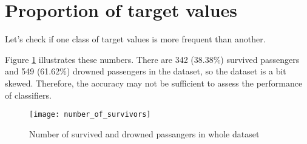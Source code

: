 \section{Proportion of target values}

Let's check if one class of target values is more frequent than another.

Figure \ref{number_of_survivors} illustrates these numbers. There are 342 
(38.38\%) survived passengers and 549 (61.62\%) drowned passengers in the 
dataset, so the dataset is a bit skewed. Therefore, the accuracy may not be 
sufficient to assess the performance of classifiers.

\begin{figure}[!ht]
	\centering
	\texttt{[image: number\_of\_survivors]}
	\caption{Number of survived and drowned passangers in whole dataset}
	\label{number_of_survivors}
\end{figure}